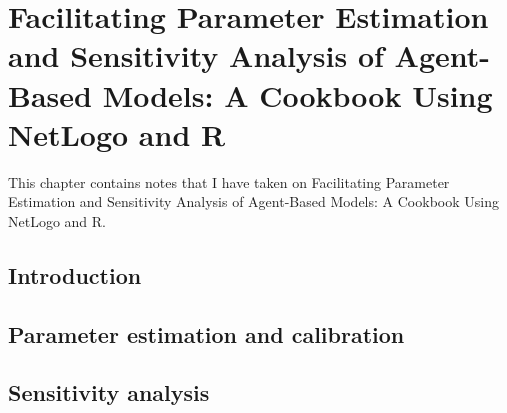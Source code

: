 \chapter{Facilitating Parameter Estimation and Sensitivity Analysis of Agent-Based Models: A Cookbook Using NetLogo and R}
\label{ch:thiele_kurther_grimm}

This chapter contains notes that I have taken on Facilitating Parameter Estimation and Sensitivity Analysis of Agent-Based Models: A Cookbook Using NetLogo and R\citep{thiele_facilitating_2014}.

\section{Introduction}
\label{thiele:introduction}

\section{Parameter estimation and calibration}
\label{thiele:parameter_estimation}

\section{Sensitivity analysis}
\label{thiele:sensitivity_analysis}

